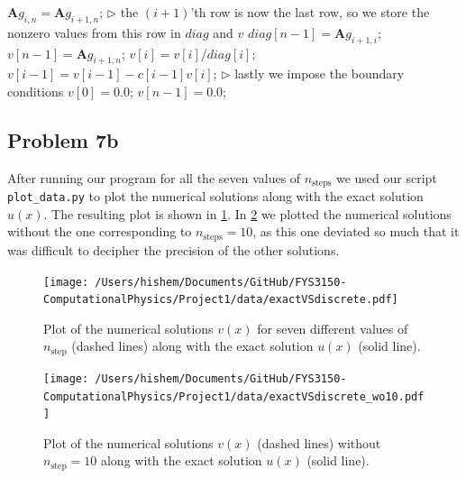 \documentclass[english,notitlepage]{revtex4-1}  %
\begin{document}
\begin{algorithm}[H]
\begin{algorithmic}
        \State $\textbf{A}g_{i,n} = \textbf{A}g_{i+1,n}$; 
        \EndFor
        \State
        \State $\triangleright$ the $(i+1)$'th row is now the last row, so we store the nonzero values from this row in $diag$ and $v$
        \State $diag[n-1] = \textbf{A}g_{i+1,i}$;  
        \State $v[n-1] = \textbf{A}g_{i+1,n}$; 
        \State
         
        \State $v[i] = v[i]/diag[i]$;  
        \State $v[i-1] = v[i-1] - c[i-1]v[i]$; 
        \EndFor
        \State
        \State $\triangleright$ lastly we impose the boundary conditions
        \State $v[0] = 0.0$;  
        \State $v[n-1] = 0.0$;  
        
    \end{algorithmic}
\end{algorithm}

\subsection*{Problem 7b}
After running our program for all the seven values of $n_\text{steps}$ we used our script \verb|plot_data.py| to plot the numerical solutions along with the exact solution $u(x)$. The resulting plot is shown in \cref{plot7b}. In \cref{plot7b w/o 10} we plotted the numerical solutions without the one corresponding to $n_\text{steps} = 10$, as this one deviated so much that it was difficult to decipher the precision of the other solutions.

\begin{figure}[h!]
    \centering 
    \texttt{[image: /Users/hishem/Documents/GitHub/FYS3150-ComputationalPhysics/Project1/data/exactVSdiscrete.pdf]} %
    \caption{Plot of the numerical solutions $v(x)$ for seven different values of $n_\text{step}$ (dashed lines) along with the exact solution $u(x)$ (solid line).}
    \label{plot7b}
\end{figure}

\begin{figure}[h!]
    \centering 
    \texttt{[image: /Users/hishem/Documents/GitHub/FYS3150-ComputationalPhysics/Project1/data/exactVSdiscrete\_wo10.pdf]} %
    \caption{Plot of the numerical solutions $v(x)$ (dashed lines) without $n_\text{step} = 10$ along with the exact solution $u(x)$ (solid line).}
    \label{plot7b w/o 10}
\end{figure}
\end{document}
